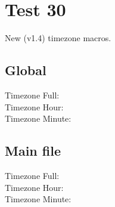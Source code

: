 \documentclass[12pt]{report}
\begin{document}
\chapter{Test 30}
New (v1.4) timezone macros.

\section{Global}
Timezone Full:   \svntimezone\\
Timezone Hour:   \svntimezonehour\\
Timezone Minute: \svntimezoneminute\\
%
%


\section{Main file}
Timezone Full:   \svnfiletimezone\\
Timezone Hour:   \svnfiletimezonehour\\
Timezone Minute: \svnfiletimezoneminute\\
%
%


\end{document}
